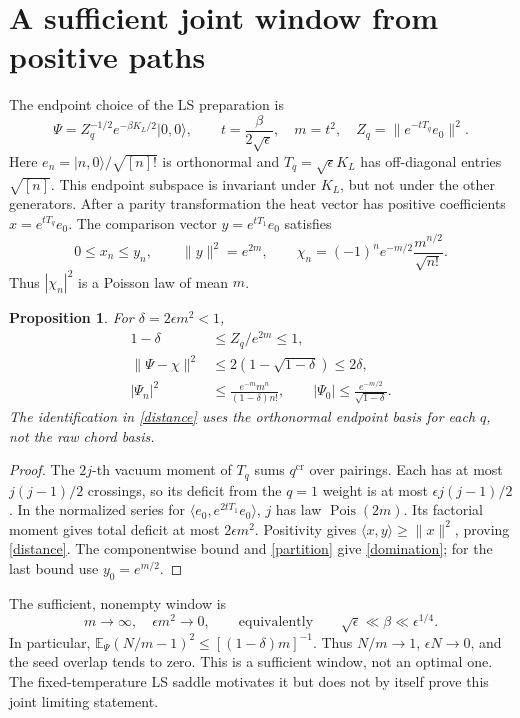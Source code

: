 \documentclass[11pt]{article}
\newtheorem{proposition}{Proposition}
\newcommand{\eps}{\epsilon}
\newcommand{\ket}[1]{|#1\rangle}
\newcommand{\Pois}{\operatorname{Pois}}
\begin{document}
\newpage
\section{A sufficient joint window from positive paths}
The endpoint choice of the LS preparation \cite[(141)]{LS} is
\begin{equation}
 \Psi=Z_q^{-1/2}e^{-\beta K_L/2}\ket{0,0},\qquad
 t=\frac{\beta}{2\sqrt\eps},\quad m=t^2,\quad
 Z_q=\|e^{-tT_q}e_0\|^2 .\label{heat}
\end{equation}
Here $e_n=\ket{n,0}/\sqrt{[n]!}$ is orthonormal and
$T_q=\sqrt\eps K_L$ has off-diagonal entries $\sqrt{[n]}$.
This endpoint subspace is invariant under $K_L$, but not under
the other generators. After a parity transformation the heat
vector has positive coefficients $x=e^{tT_q}e_0$.
The comparison vector $y=e^{tT_1}e_0$ satisfies
\[
 0\le x_n\le y_n,\qquad \|y\|^2=e^{2m},\qquad
 \chi_n=(-1)^n e^{-m/2}\frac{m^{n/2}}{\sqrt{n!}}.
\]
Thus $|\chi_n|^2$ is a Poisson law of mean $m$.

\begin{proposition}\label{comparison}
For $\delta=2\eps m^2<1$,
\begin{align}
 1-\delta&\le Z_q/e^{2m}\le1,\label{partition}\\
 \|\Psi-\chi\|^2&\le2(1-\sqrt{1-\delta})\le2\delta,\label{distance}\\
 |\Psi_n|^2&\le\frac{e^{-m}m^n}{(1-\delta)n!},\qquad
 |\Psi_0|\le\frac{e^{-m/2}}{\sqrt{1-\delta}}.\label{domination}
\end{align}
The identification in \eqref{distance} uses the orthonormal
endpoint basis for each $q$, not the raw chord basis.
\end{proposition}
\begin{proof}
The $2j$-th vacuum moment of $T_q$ sums $q^{\mathrm{cr}}$
over pairings. Each has at most $j(j-1)/2$ crossings, so its
deficit from the $q=1$ weight is at most
$\eps j(j-1)/2$. In the normalized series for
$\langle e_0,e^{2tT_1}e_0\rangle$, $j$ has law $\Pois(2m)$.
Its factorial moment gives total deficit at most $2\eps m^2$.
Positivity gives $\langle x,y\rangle\ge\|x\|^2$, proving
\eqref{distance}. The componentwise bound and \eqref{partition}
give \eqref{domination}; for the last bound use $y_0=e^{m/2}$.
\end{proof}

The sufficient, nonempty window is
\begin{equation}
 m\longrightarrow\infty,\quad \eps m^2\longrightarrow0,
 \qquad\text{equivalently}\qquad
 \sqrt\eps\ll\beta\ll\eps^{1/4}.\label{window}
\end{equation}
In particular,
$\mathbb E_\Psi(N/m-1)^2\le[(1-\delta)m]^{-1}$.
Thus $N/m\to1$, $\eps N\to0$, and the seed overlap tends to
zero. This is a sufficient window, not an optimal one. The
fixed-temperature LS saddle motivates it but does not by itself
prove this joint limiting statement.
\end{document}
